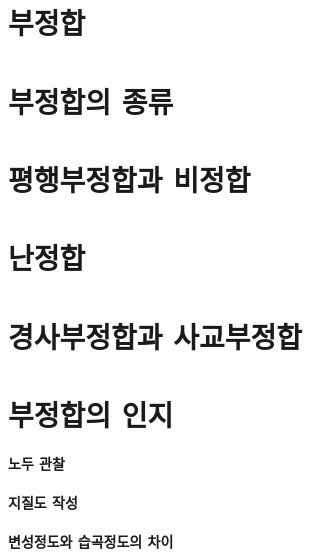 \documentclass[12pt, a4paper, oneside]{book}
\begin{document}
	\clearpage
	\section{부정합}
	
	
	\clearpage
	\section{부정합의 종류}
	
	
	
	\clearpage
	\section{평행부정합과 비정합}



	\clearpage
	\section{난정합}
	
	
	\clearpage
	\section{경사부정합과 사교부정합}
	
	
	\clearpage
	\section{부정합의 인지}
	
	
	
		\paragraph{노두 관찰}
		
		
		\paragraph{지질도 작성}
		
		
		\paragraph{변성정도와 습곡정도의 차이}
		
\end{document}
